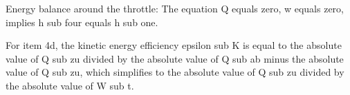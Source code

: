 Energy balance around the throttle:
The equation Q equals zero, w equals zero, implies h sub four equals h sub one.

For item 4d, the kinetic energy efficiency epsilon sub K is equal to the absolute value of Q sub zu divided by the absolute value of Q sub ab minus the absolute value of Q sub zu, which simplifies to the absolute value of Q sub zu divided by the absolute value of W sub t.